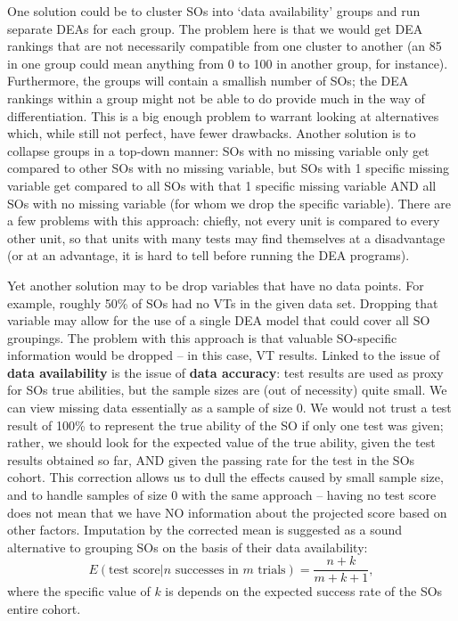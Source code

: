 One solution could be to cluster SOs into `data availability' groups and run separate DEAs for each group.  The problem here is that we would get DEA rankings that are not necessarily compatible from one cluster to another (an 85 in one group could mean anything from 0 to 100 in another group, for instance). Furthermore, the groups will  contain a smallish number of SOs; the DEA rankings within a group might not be able to do provide much in the way of differentiation. This is a big enough problem to warrant looking at alternatives which, while still not perfect, have fewer drawbacks. 
\newl Another solution is to collapse groups in a top-down manner: SOs with no missing variable only get compared to other SOs with no missing variable, but SOs with 1 specific missing variable get compared to all SOs with that 1 specific missing variable AND all SOs with no missing variable (for whom we drop the specific variable). There are a few problems with this approach: chiefly, not every unit is compared to every other unit, so that units with many tests may find themselves at a disadvantage (or at an advantage, it is hard to tell before running the DEA programs).  

Yet another solution may to be drop variables that have no data points.  For example, roughly 50\% of SOs had no VTs in the given data set.  Dropping that variable may allow for the use of a single DEA model that could cover all SO groupings.  The problem with this approach is that valuable SO-specific information would be dropped -- in this case, VT results.
\newl Linked to the issue of \textbf{data availability} is the issue of \textbf{data accuracy}: test results are used as proxy for SOs true abilities, but the sample sizes are (out of necessity) quite small. We can view missing data essentially as a sample of size 0. We would not trust a test result of 100\% to represent the true ability of the SO if only one test was given; rather, we should look for the expected value of the true ability, given the test results obtained so far, AND given the passing rate for the test in the SOs cohort. This correction allows us to dull the effects caused by small sample size, and to handle samples of size 0 with the same approach -- having no test score does not mean that we have NO information about the projected score based on other factors. Imputation by the corrected mean is suggested as a sound alternative to grouping SOs on the basis of their data availability: $$E\left(\text{test score}|n \text{ successes in }m \text{ trials}\right)=\frac{n+k}{m+k+1}, $$ where the specific value of $k$ is depends on the expected success rate of the SOs entire cohort. 

